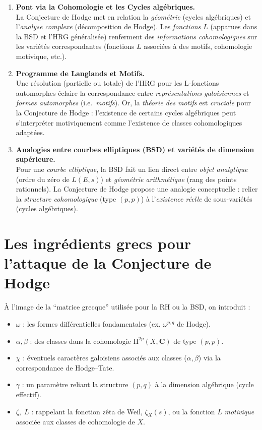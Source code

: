\documentclass[11pt]{article}
\begin{document}
\begin{enumerate}
  \item \textbf{Pont via la Cohomologie et les Cycles algébriques.}\\
    La Conjecture de Hodge met en relation la \emph{géométrie} (cycles algébriques) et l'\emph{analyse complexe} (décomposition de Hodge). Les \emph{fonctions $L$} (apparues dans la BSD et l'HRG généralisée) renferment des \emph{informations cohomologiques} sur les variétés correspondantes (fonctions $L$ associées à des motifs, cohomologie motivique, etc.).

  \item \textbf{Programme de Langlands et Motifs.}\\
    Une résolution (partielle ou totale) de l'HRG pour les L-fonctions automorphes éclaire la correspondance entre \emph{représentations galoisiennes} et \emph{formes automorphes} (i.e.\ \emph{motifs}). Or, la \emph{théorie des motifs} est \emph{cruciale} pour la Conjecture de Hodge : l'existence de certains cycles algébriques peut s'interpréter motiviquement comme l'existence de classes cohomologiques adaptées.

  \item \textbf{Analogies entre courbes elliptiques (BSD) et variétés de dimension supérieure.}\\
    Pour une \emph{courbe elliptique}, la BSD fait un lien direct entre \emph{objet analytique} (ordre du zéro de $L(E,s)$) et \emph{géométrie arithmétique} (rang des points rationnels). La Conjecture de Hodge propose une analogie conceptuelle : relier la \emph{structure cohomologique} (type $(p,p)$) à l'\emph{existence réelle} de sous-variétés (cycles algébriques).
\end{enumerate}

\section{Les ingrédients grecs pour l'attaque de la Conjecture de Hodge}

À l'image de la “matrice grecque” utilisée pour la RH ou la BSD, on introduit :

\begin{itemize}
  \item \(\omega\) : les formes différentielles fondamentales (ex. \(\omega^{p,q}\) de Hodge).
  \item \(\alpha, \beta\) : des classes dans la cohomologie \(\mathrm{H}^{2p}(X,\mathbf{C})\) de type \((p,p)\).
  \item \(\chi\) : éventuels caractères galoisiens associés aux classes (\(\alpha,\beta\)) via la correspondance de Hodge--Tate.
  \item \(\gamma\) : un paramètre reliant la structure $(p,q)$ à la dimension algébrique (cycle effectif).
  \item \(\zeta,\;L\) : rappelant la fonction zêta de Weil, \(\zeta_X(s)\), ou la fonction $L$ \emph{motivique} associée aux classes de cohomologie de $X$.
\end{itemize}
\end{document}
